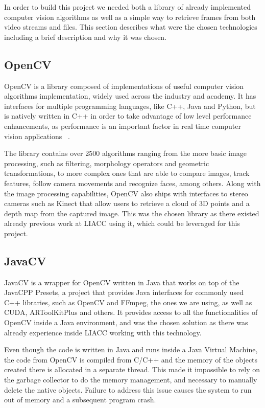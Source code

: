In order to build this project we needed both a library of already implemented computer vision algorithms as well as a simple way to retrieve frames from both video streams and files. This section describes what were the chosen technologies including a brief description and why it was chosen.

\subsection{OpenCV}
OpenCV is a library composed of implementations of useful computer vision algorithms implementation, widely used across the industry and academy. It has interfaces for multiple programming languages, like C++, Java and Python, but is natively written in C++ in order to take advantage of low level performance enhancements, as performance is an important factor in real time computer vision applications ~\cite{opencv_about_2017}.

The library contains over 2500 algorithms ranging from the more basic image processing, such as filtering, morphology operators and geometric transformations, to more complex ones that are able to compare images, track features, follow camera movements and recognize faces, among others. Along with the image processing capabilities, OpenCV also ships with interfaces to stereo cameras such as Kinect that allow users to retrieve a cloud of 3D points and a depth map from the captured image. This was the chosen library as there existed already previous work at LIACC using it, which could be leveraged for this project.

\subsection{JavaCV}
JavaCV is a wrapper for OpenCV written in Java that works on top of the JavaCPP Presets, a project that provides Java interfaces for commonly used C++ libraries, such as OpenCV and FFmpeg, the ones we are using, as well as CUDA, ARToolKitPlus and others. It provides access to all the functionalities of OpenCV inside a Java environment, and was the chosen solution as there was already experience inside LIACC working with this technology.

Even though the code is written in Java and runs inside a Java Virtual Machine, the code from OpenCV is compiled from C/C++ and the memory of the objects created there is allocated in a separate thread. This made it impossible to rely on the garbage collector to do the memory management, and necessary to manually delete the native objects. Failure to address this issue causes the system to run out of memory and a subsequent program crash.

